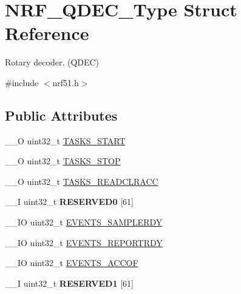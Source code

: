 \hypertarget{struct_n_r_f___q_d_e_c___type}{}\section{N\+R\+F\+\_\+\+Q\+D\+E\+C\+\_\+\+Type Struct Reference}
\label{struct_n_r_f___q_d_e_c___type}


Rotary decoder. (Q\+D\+E\+C)  




{\ttfamily \#include $<$nrf51.\+h$>$}

\subsection*{Public Attributes}
\begin{DoxyCompactItemize}
\item 
\+\_\+\+\_\+\+O uint32\+\_\+t \hyperlink{struct_n_r_f___q_d_e_c___type_af0070d9ac38001ecb1a8c3712a8a65fc}{T\+A\+S\+K\+S\+\_\+\+S\+T\+A\+R\+T}
\item 
\+\_\+\+\_\+\+O uint32\+\_\+t \hyperlink{struct_n_r_f___q_d_e_c___type_a4fe0d92f07c4b2e14b4f83f53326f570}{T\+A\+S\+K\+S\+\_\+\+S\+T\+O\+P}
\item 
\+\_\+\+\_\+\+O uint32\+\_\+t \hyperlink{struct_n_r_f___q_d_e_c___type_a1d78f8c318aef030178930e29cefcd8a}{T\+A\+S\+K\+S\+\_\+\+R\+E\+A\+D\+C\+L\+R\+A\+C\+C}
\item 
\hypertarget{struct_n_r_f___q_d_e_c___type_af0a88fdefd1bace3b4c4c69cdc8db903}{}\+\_\+\+\_\+\+I uint32\+\_\+t {\bfseries R\+E\+S\+E\+R\+V\+E\+D0} \mbox{[}61\mbox{]}\label{struct_n_r_f___q_d_e_c___type_af0a88fdefd1bace3b4c4c69cdc8db903}

\item 
\+\_\+\+\_\+\+I\+O uint32\+\_\+t \hyperlink{struct_n_r_f___q_d_e_c___type_a271e91771f17fb72f9b84bd09bfcd115}{E\+V\+E\+N\+T\+S\+\_\+\+S\+A\+M\+P\+L\+E\+R\+D\+Y}
\item 
\+\_\+\+\_\+\+I\+O uint32\+\_\+t \hyperlink{struct_n_r_f___q_d_e_c___type_a652327f7f3e5d8fa43c3bbbe12e74465}{E\+V\+E\+N\+T\+S\+\_\+\+R\+E\+P\+O\+R\+T\+R\+D\+Y}
\item 
\+\_\+\+\_\+\+I\+O uint32\+\_\+t \hyperlink{struct_n_r_f___q_d_e_c___type_a30a4a26779e728214689170746553f07}{E\+V\+E\+N\+T\+S\+\_\+\+A\+C\+C\+O\+F}
\item 
\hypertarget{struct_n_r_f___q_d_e_c___type_a2c301be367e3f702799fc9fb9ea02295}{}\+\_\+\+\_\+\+I uint32\+\_\+t {\bfseries R\+E\+S\+E\+R\+V\+E\+D1} \mbox{[}61\mbox{]}\label{struct_n_r_f___q_d_e_c___type_a2c301be367e3f702799fc9fb9ea02295}


\end{DoxyCompactItemize}

